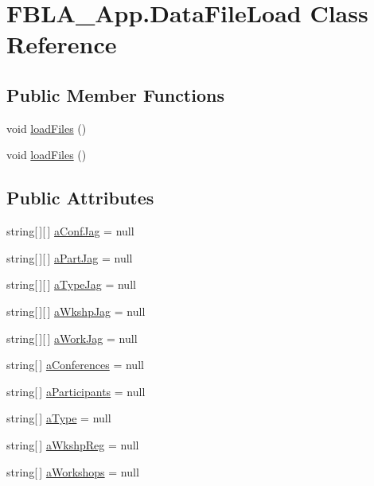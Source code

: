 \hypertarget{class_f_b_l_a___app_1_1_data_file_load}{\section{F\+B\+L\+A\+\_\+\+App.\+Data\+File\+Load Class Reference}
\label{class_f_b_l_a___app_1_1_data_file_load}
}
\subsection*{Public Member Functions}
\begin{DoxyCompactItemize}
\item 
void \hyperlink{class_f_b_l_a___app_1_1_data_file_load_ad47f6ec5047e82062880b4155de676e4}{load\+Files} ()
\item 
void \hyperlink{class_f_b_l_a___app_1_1_data_file_load_ad47f6ec5047e82062880b4155de676e4}{load\+Files} ()
\end{DoxyCompactItemize}
\subsection*{Public Attributes}
\begin{DoxyCompactItemize}
\item 
string\mbox{[}$\,$\mbox{]}\mbox{[}$\,$\mbox{]} \hyperlink{class_f_b_l_a___app_1_1_data_file_load_a276ea819860ce1e04242a5a4f909d429}{a\+Conf\+Jag} = null
\item 
string\mbox{[}$\,$\mbox{]}\mbox{[}$\,$\mbox{]} \hyperlink{class_f_b_l_a___app_1_1_data_file_load_acff62a9bb86677318fca538da11a6296}{a\+Part\+Jag} = null
\item 
string\mbox{[}$\,$\mbox{]}\mbox{[}$\,$\mbox{]} \hyperlink{class_f_b_l_a___app_1_1_data_file_load_a8375bab9dfdbc7f61c60d2a09346c297}{a\+Type\+Jag} = null
\item 
string\mbox{[}$\,$\mbox{]}\mbox{[}$\,$\mbox{]} \hyperlink{class_f_b_l_a___app_1_1_data_file_load_a0c23e07eaf9d664a1b3e5e165b7cd091}{a\+Wkshp\+Jag} = null
\item 
string\mbox{[}$\,$\mbox{]}\mbox{[}$\,$\mbox{]} \hyperlink{class_f_b_l_a___app_1_1_data_file_load_ad0355396f35a5d055193bfcbde5afc79}{a\+Work\+Jag} = null
\item 
string\mbox{[}$\,$\mbox{]} \hyperlink{class_f_b_l_a___app_1_1_data_file_load_a3d495ef31a25b1f1eb472ecab72a3232}{a\+Conferences} = null
\item 
string\mbox{[}$\,$\mbox{]} \hyperlink{class_f_b_l_a___app_1_1_data_file_load_aa834ccb3df879a0242cc5d572dad190c}{a\+Participants} = null
\item 
string\mbox{[}$\,$\mbox{]} \hyperlink{class_f_b_l_a___app_1_1_data_file_load_a99d8bc15c2fb77c802b81c74067c9c59}{a\+Type} = null
\item 
string\mbox{[}$\,$\mbox{]} \hyperlink{class_f_b_l_a___app_1_1_data_file_load_a423217633c64b23df4ec33983408612c}{a\+Wkshp\+Reg} = null
\item 
string\mbox{[}$\,$\mbox{]} \hyperlink{class_f_b_l_a___app_1_1_data_file_load_aaee123c1fcfe7efbbd2af7b5bf35c52a}{a\+Workshops} = null
\end{DoxyCompactItemize}


